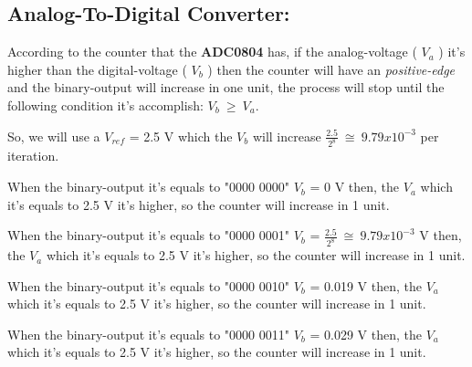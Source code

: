 \subsection{Analog-To-Digital Converter:}

According to the counter that the {\bfseries ADC0804} has, if the analog-voltage ( $V_{a}$ ) it's higher than the digital-voltage ( $V_{b}$ ) then the counter will have an {\itshape positive-edge} and the binary-output will increase in one unit, the process will stop until the following condition it's accomplish: $V_{b}\ \geq \ V_{a}$. \hfill \break

So, we will use a $V_{ref}$ = 2.5 V which the $V_{b}$ will increase $\frac{2.5}{2^{8}}\ \cong\ 9.79 x 10^{-3}$ per iteration. \hfill \break

{\bfseries\itshape\color{Violet}{
\begin{itemize}
\item For the first iteration:
\end{itemize}}} \hfill

When the binary-output it's equals to "0000 0000" $V_{b}$ = 0 V then, the $V_{a}$ which it's equals to 2.5 V it's higher, so the counter will increase in 1 unit. \hfill \break

{\bfseries\itshape\color{Violet}{
\begin{itemize}
\item For the second iteration:
\end{itemize}}} \hfill

When the binary-output it's equals to "0000 0001" $V_{b}$ = $\frac{2.5}{2^{8}}\ \cong\ 9.79 x 10^{-3}$ V then, the $V_{a}$ which it's equals to 2.5 V it's higher, so the counter will increase in 1 unit. \hfill \break

{\bfseries\itshape\color{Violet}{
\begin{itemize}
\item For the third iteration:
\end{itemize}}} \hfill

When the binary-output it's equals to "0000 0010" $V_{b}$ = 0.019 V then, the $V_{a}$ which it's equals to 2.5 V it's higher, so the counter will increase in 1 unit. \hfill \break


{\bfseries\itshape\color{Violet}{
\begin{itemize}
\item For the fourth iteration:
\end{itemize}}} \hfill

When the binary-output it's equals to "0000 0011" $V_{b}$ = 0.029 V then, the $V_{a}$ which it's equals to 2.5 V it's higher, so the counter will increase in 1 unit. \hfill \break

